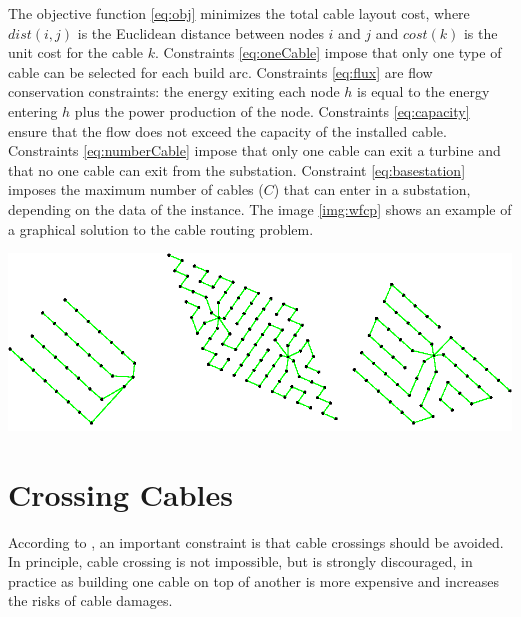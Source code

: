 The objective function \ref{eq:obj} minimizes the total cable layout cost, where $dist(i, j)$ is the Euclidean distance between nodes $i$ and $j$ and $cost(k)$ is the unit cost for the cable $k$. 
Constraints \ref{eq:oneCable} impose that only one type of cable can be selected for each build arc.
Constraints \ref{eq:flux} are flow conservation constraints: the energy exiting each node $h$ is equal to the energy entering $h$ plus the power production of the node. 
Constraints \ref{eq:capacity} ensure that the flow does not exceed the capacity of the installed cable.
Constraints \ref{eq:numberCable} impose that only one cable can exit a turbine and that no one cable can exit from the substation. 
Constraint \ref{eq:basestation} imposes the maximum number of cables ($C$) that can enter in a substation, depending on the data of the instance. The image \ref{img:wfcp} shows an example of a graphical solution to the cable routing problem.

\begin{center}
	\includegraphics[scale=0.4]{Graphics/wfcp.png}
	\label{img:wfcp}
\end{center}
	
\section{Crossing Cables}
According to \cite{wfcp}, an important constraint is that cable crossings should be avoided. In principle, cable crossing is not impossible, but is strongly discouraged, in practice as building one cable on top of another is more expensive and increases the risks of cable damages.\\

